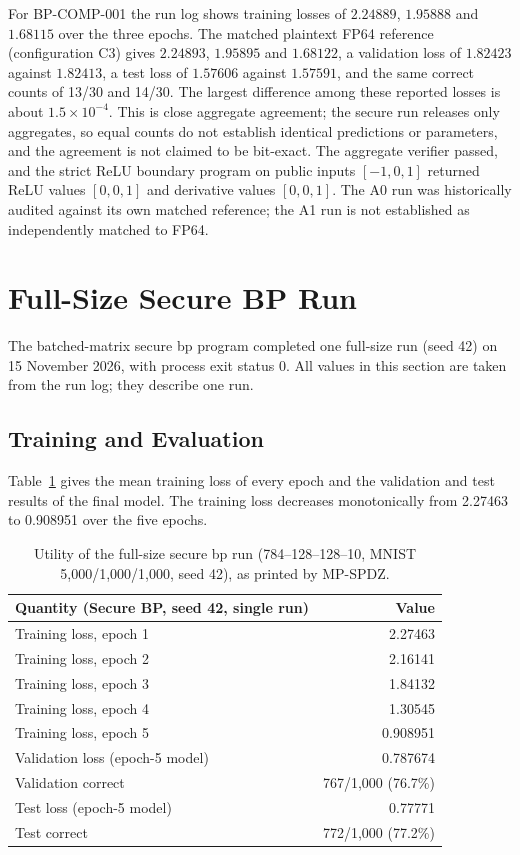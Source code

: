 For BP-COMP-001 the run log shows training losses of $2.24889$, $1.95888$ and $1.68115$ over the three epochs. The matched plaintext FP64 reference (configuration C3) gives $2.24893$, $1.95895$ and $1.68122$, a validation loss of $1.82423$ against $1.82413$, a test loss of $1.57606$ against $1.57591$, and the same correct counts of 13/30 and 14/30. The largest difference among these reported losses is about $1.5\times10^{-4}$. This is close aggregate agreement; the secure run releases only aggregates, so equal counts do not establish identical predictions or parameters, and the agreement is not claimed to be bit-exact. The aggregate verifier passed, and the strict ReLU boundary program on public inputs $[-1,0,1]$ returned ReLU values $[0,0,1]$ and derivative values $[0,0,1]$. The A0 run was historically audited against its own matched reference; the A1 run is not established as independently matched to FP64.

\section{Full-Size Secure BP Run}\label{sec:res-full}
The batched-matrix secure \ac{bp} program completed one full-size run (seed 42) on 15 November 2026, with process exit status 0. All values in this section are taken from the run log; they describe one run.

\FloatBarrier
\subsection{Training and Evaluation}\label{sec:res-full-utility}
Table~\ref{tab:res-full-train} gives the mean training loss of every epoch and the validation and test results of the final model. The training loss decreases monotonically from 2.27463 to 0.908951 over the five epochs.

\begin{table}[htbp]
\centering
\small
\begin{tabular}{@{}lr@{}}
\toprule
Quantity (Secure BP, seed 42, single run) & Value \\
\midrule
Training loss, epoch 1 & 2.27463 \\
Training loss, epoch 2 & 2.16141 \\
Training loss, epoch 3 & 1.84132 \\
Training loss, epoch 4 & 1.30545 \\
Training loss, epoch 5 & 0.908951 \\
Validation loss (epoch-5 model) & 0.787674 \\
Validation correct & 767/1{,}000 (76.7\%) \\
Test loss (epoch-5 model) & 0.77771 \\
Test correct & 772/1{,}000 (77.2\%) \\
\bottomrule
\end{tabular}
\caption{Utility of the full-size secure \ac{bp} run (784--128--128--10, MNIST 5{,}000/1{,}000/1{,}000, seed 42), as printed by MP-SPDZ.}
\label{tab:res-full-train}
\end{table}

